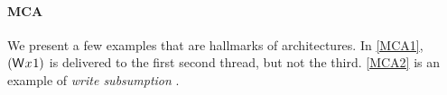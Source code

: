 \paragraph{MCA} We present a few examples that are hallmarks of \mca{}
architectures.  
In \ref{MCA1}, $(\DW{x}{1})$ is delivered to the first second thread, but not
the third. \ref{MCA2} is an example of \emph{write subsumption}
\cite[]{DBLP:journals/pacmpl/PulteFDFSS18}.
